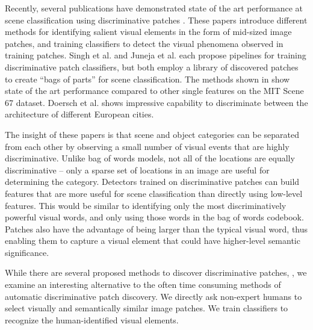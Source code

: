 \documentclass[10pt,twocolumn,letterpaper]{article}
\begin{document}
Recently, several publications have demonstrated state of the art performance at scene classification using discriminative patches \cite{singh2012unsupervised, doersch2012makes, juneja13blocks}. These papers introduce different methods for identifying salient visual elements in the form of mid-sized image patches,  and training classifiers to detect the visual phenomena observed in training patches. Singh et al. and Juneja et al. each propose pipelines for training discriminative patch classifiers, but both employ a library of discovered patches to create ``bags of parts'' for scene classification. The methods shown in \cite{singh2012unsupervised, juneja13blocks} show state of the art performance compared to other single features on the MIT Scene 67 dataset. Doersch et al. shows impressive capability to discriminate between the architecture of different European cities. 

The insight of these papers is that scene and object categories can be separated from each other by observing a small number of visual events that are highly discriminative. Unlike bag of words models, not all of the locations are equally discriminative -- only a sparse set of locations in an image are useful for determining the category. Detectors trained on discriminative patches can build features that are more useful for scene classification than directly using low-level features. This would be similar to identifying only the most discriminatively powerful visual words, and only using those words in the bag of words codebook. Patches also have the advantage of being larger than the typical visual word, thus enabling them to capture a visual element that could have higher-level semantic significance. 

While there are several proposed methods to discover discriminative patches, \cite{singh2012unsupervised, juneja13blocks}, we examine an interesting alternative to the often time consuming methods of automatic discriminative patch discovery. We directly ask non-expert humans to select visually and semantically similar image patches. We train classifiers to recognize the human-identified visual elements. 
\end{document}
